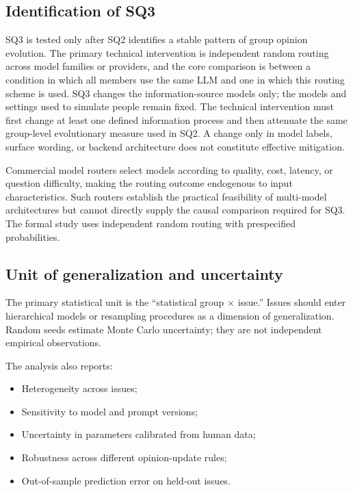\documentclass[11pt,a4paper]{article}
\begin{document}
\subsection{Identification of SQ3}

SQ3 is tested only after SQ2 identifies a stable pattern of group opinion evolution. The primary technical intervention is independent random routing across model families or providers, and the core comparison is between a condition in which all members use the same LLM and one in which this routing scheme is used. SQ3 changes the information-source models only; the models and settings used to simulate people remain fixed. The technical intervention must first change at least one defined information process and then attenuate the same group-level evolutionary measure used in SQ2. A change only in model labels, surface wording, or backend architecture does not constitute effective mitigation.

Commercial model routers select models according to quality, cost, latency, or question difficulty, making the routing outcome endogenous to input characteristics. Such routers establish the practical feasibility of multi-model architectures but cannot directly supply the causal comparison required for SQ3. The formal study uses independent random routing with prespecified probabilities.

\subsection{Unit of generalization and uncertainty}

The primary statistical unit is the ``statistical group $\times$ issue.'' Issues should enter hierarchical models or resampling procedures as a dimension of generalization. Random seeds estimate Monte Carlo uncertainty; they are not independent empirical observations.

The analysis also reports:

\begin{itemize}
\item Heterogeneity across issues;
\item Sensitivity to model and prompt versions;
\item Uncertainty in parameters calibrated from human data;
\item Robustness across different opinion-update rules;
\item Out-of-sample prediction error on held-out issues.
\end{itemize}
\end{document}
